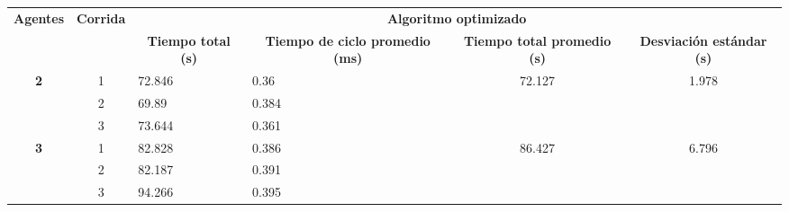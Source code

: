 \begin{table}[H]
	\centering
	\resizebox{\textwidth}{!} {
	\begin{tabular}{|c|c|llcc|}
		\hline
		\multirow{2}{*}{\textbf{Agentes}} & \multirow{2}{*}{\textbf{Corrida}} & \multicolumn{4}{c|}{\textbf{Algoritmo optimizado}}                                                                                                                                                        \\ \cline{3-6} 
		&                                   & \multicolumn{1}{c|}{\textbf{Tiempo total (s)}} & \multicolumn{1}{c|}{\textbf{Tiempo de ciclo promedio (ms)}} & \multicolumn{1}{c|}{\textbf{Tiempo total promedio (s)}} & \textbf{Desviación estándar (s)} \\ \hline
		\multirow{3}{*}{\textbf{2}}       & 1                                 & \multicolumn{1}{l|}{72.846}                    & \multicolumn{1}{l|}{0.36}                                   & \multicolumn{1}{c|}{\multirow{3}{*}{72.127}}            & \multirow{3}{*}{1.978}           \\ \cline{2-4}
		& 2                                 & \multicolumn{1}{l|}{69.89}                     & \multicolumn{1}{l|}{0.384}                                  & \multicolumn{1}{c|}{}                                   &                                  \\ \cline{2-4}
		& 3                                 & \multicolumn{1}{l|}{73.644}                    & \multicolumn{1}{l|}{0.361}                                  & \multicolumn{1}{c|}{}                                   &                                  \\ \hline
		\multirow{3}{*}{\textbf{3}}       & 1                                 & \multicolumn{1}{l|}{82.828}                    & \multicolumn{1}{l|}{0.386}                                  & \multicolumn{1}{c|}{\multirow{3}{*}{86.427}}            & \multirow{3}{*}{6.796}           \\ \cline{2-4}
		& 2                                 & \multicolumn{1}{l|}{82.187}                    & \multicolumn{1}{l|}{0.391}                                  & \multicolumn{1}{c|}{}                                   &                                  \\ \cline{2-4}
		& 3                                 & \multicolumn{1}{l|}{94.266}                    & \multicolumn{1}{l|}{0.395}                                  & \multicolumn{1}{c|}{}                                   &                                  \\ \hline

\end{tabular}}
\end{table}
